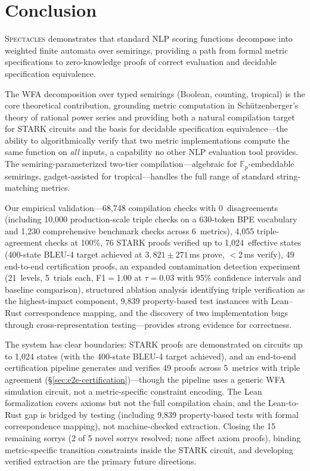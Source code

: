 \documentclass[11pt]{article}
\newcommand{\spectacles}{\textsc{Spectacles}}
\newcommand{\F}{\mathbb{F}}
\begin{document}
\section{Conclusion}\label{sec:conclusion}

\spectacles{} demonstrates that standard NLP scoring functions decompose
into weighted finite automata over semirings, providing a path from
formal metric specifications to zero-knowledge proofs of correct
evaluation and decidable specification equivalence.

The WFA decomposition over typed semirings (Boolean, counting, tropical)
is the core theoretical contribution, grounding metric computation in
Sch\"utzenberger's theory of rational power series and providing both
a natural compilation target for STARK circuits and the basis for
decidable specification equivalence---the ability to algorithmically
verify that two metric implementations compute the same function on
\emph{all} inputs, a capability no other NLP evaluation tool provides.
The semiring-parameterized two-tier compilation---algebraic for
$\F_p$-embeddable semirings, gadget-assisted for tropical---handles
the full range of standard string-matching metrics.

Our empirical validation---68{,}748 compilation checks with
0~disagreements (including 10{,}000 production-scale triple checks on a 630-token BPE vocabulary
and 1{,}230 comprehensive benchmark checks across 6~metrics),
4{,}055 triple-agreement checks at 100\%,
76 STARK proofs verified up to 1{,}024~effective states
(400-state BLEU-4 target achieved at $3{,}821 \pm 271$\,ms prove,
$<$2\,ms verify), 49 end-to-end certification proofs, an expanded contamination
detection experiment (21~levels, 5~trials each, F1$=$1.00 at
$\tau = 0.03$ with 95\% confidence intervals and baseline comparison),
structured ablation analysis identifying triple verification as the
highest-impact component, 9{,}839 property-based test
instances with Lean--Rust correspondence mapping, and the
discovery of two implementation bugs through
cross-representation testing---provides strong evidence
for correctness.

The system has clear boundaries: STARK proofs are demonstrated on
circuits up to 1{,}024 states (with the 400-state BLEU-4 target achieved),
and an end-to-end certification pipeline generates and verifies
49 proofs across 5~metrics with triple agreement
(\S\ref{sec:e2e-certification})---though the pipeline uses a generic
WFA simulation circuit, not a metric-specific constraint encoding.
The Lean formalization covers axioms but not
the full compilation chain, and the Lean-to-Rust gap is bridged
by testing (including 9{,}839 property-based tests with formal
correspondence mapping), not machine-checked extraction.
Closing the 15 remaining sorrys (2 of 5 novel sorrys resolved;
none affect axiom proofs), binding metric-specific transition
constraints inside the STARK circuit, and
developing verified extraction are the primary future directions.
\end{document}
